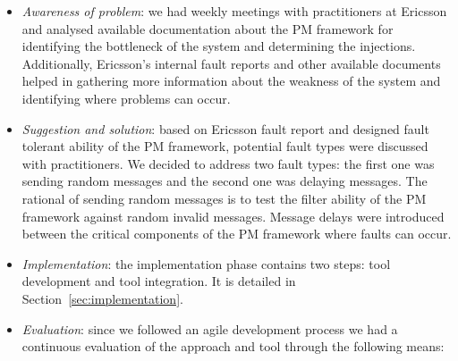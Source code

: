 \begin{itemize}
\item{\em Awareness of problem}: %
we had weekly 
meetings with practitioners %
at Ericsson and  analysed available documentation about the PM framework 
for identifying the bottleneck of the system and determining the injections. Additionally, Ericsson's internal fault reports and other available documents helped in gathering more information about the weakness of the system and identifying where problems can occur. 
\item 
{\em Suggestion and solution}: based on Ericsson fault report and designed fault tolerant ability of the PM framework, potential fault types were discussed with practitioners. We decided to address two fault types: the first one was sending random messages and the second one was delaying messages. The rational of sending random messages is to 
test the filter ability of the PM framework against random invalid messages. Message delays were introduced between the critical components of the PM framework where faults can occur.
\item 
{\em Implementation}: the implementation phase contains two steps: tool development and tool integration. It is detailed in Section~\ref{sec:implementation}. %
\item 
{\em Evaluation}: since we followed an agile development process we had a continuous evaluation of the approach and tool through the following means: %

\end{itemize}
